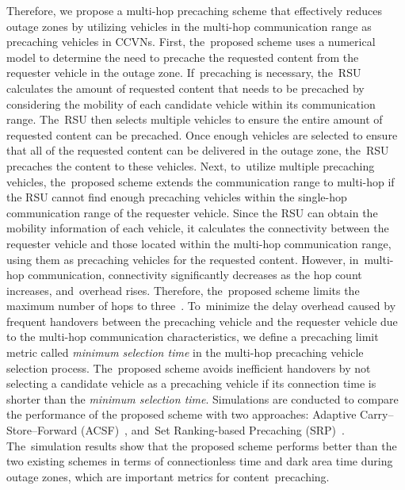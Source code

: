 \documentclass[electronics,aricle,accept,pdftex,moreauthors]{Definitions/mdpi}
\begin{document}
Therefore, we propose a multi-hop precaching scheme that effectively reduces outage zones by utilizing vehicles in the multi-hop communication range as precaching vehicles in CCVNs. First, the~proposed scheme uses a numerical model to determine the need to precache the requested content from the requester vehicle in the outage zone. If~precaching is necessary, the~RSU calculates the amount of requested content that needs to be precached by considering the mobility of each candidate vehicle within its communication range. The~RSU then selects multiple vehicles to ensure the entire amount of requested content can be precached. Once enough vehicles are selected to ensure that all of the requested content can be delivered in the outage zone, the~RSU precaches the content to these vehicles. Next, to~utilize multiple precaching vehicles, the~proposed scheme extends the communication range to multi-hop if the RSU cannot find enough precaching vehicles within the single-hop communication range of the requester vehicle. Since the RSU can obtain the mobility information of each vehicle, it calculates the connectivity between the requester vehicle and those located within the multi-hop communication range, using them as precaching vehicles for the requested content. However, in~multi-hop communication, connectivity significantly decreases as the hop count increases, and~overhead rises. Therefore, the~proposed scheme limits the maximum number of hops to three~\cite{Gupta2000}. To~minimize the delay overhead caused by frequent handovers between the precaching vehicle and the requester vehicle due to the multi-hop communication characteristics, we define a precaching limit metric called \textit{minimum selection time} in the multi-hop precaching vehicle selection process. The~proposed scheme avoids inefficient handovers by not selecting a candidate vehicle as a precaching vehicle if its connection time is shorter than the \textit{minimum selection time}. Simulations are conducted to compare the performance of the proposed scheme with two approaches: Adaptive Carry--Store--Forward (ACSF)~\cite{Wu2013}, and~Set Ranking-based Precaching (SRP)~\cite{Nam2023}. The~simulation results show that the proposed scheme performs better than the two existing schemes in terms of connectionless time and dark area time during outage zones, which are important metrics for content~precaching.
\end{document}
